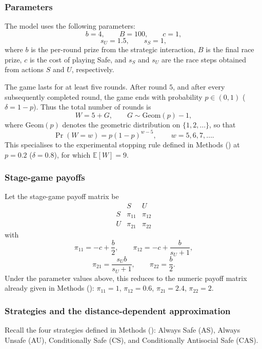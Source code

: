 \documentclass[pdflatex,sn-mathphys-ay]{sn-jnl}
\theoremstyle{thmstyleone}
\theoremstyle{thmstyletwo}
\theoremstyle{thmstylethree}
\begin{document}
\subsubsection{Parameters}

The model uses the following parameters:
\[
b = 4, \qquad B = 100, \qquad c = 1,
\]
\[
s_U = 1.5, \qquad s_S = 1,
\]
where \(b\) is the per-round prize from the strategic interaction, \(B\) is the final race prize, \(c\) is the cost of playing Safe, and \(s_S\) and \(s_U\) are the race steps obtained from actions \(S\) and \(U\), respectively.

The game lasts for at least five rounds. After round \(5\), and after every subsequently completed round, the game ends with probability \(p\in(0,1)\) ($\delta=1-p$). Thus the total number of rounds is
\[
W = 5 + G,
\qquad
G \sim \mathrm{Geom}(p)-1,
\]
where \(\mathrm{Geom}(p)\) denotes the geometric distribution on \(\{1,2,\dots\}\), so that
\[
\Pr(W=w)=p(1-p)^{w-5},
\qquad w=5,6,7,\dots.
\]
This specialises to the experimental stopping rule defined in Methods () at \(p=0.2\) (\(\delta=0.8\)), for which \(\mathbb{E}[W]=9\).

\subsubsection{Stage-game payoffs}

Let the stage-game payoff matrix be
\[
\begin{array}{c|cc}
 & S & U\\
\hline
S & \pi_{11} & \pi_{12}\\
U & \pi_{21} & \pi_{22}
\end{array}
\]
with
\[
\pi_{11} = -c + \frac{b}{2},
\qquad
\pi_{12} = -c + \frac{b}{s_U+1},
\]
\[
\pi_{21} = \frac{s_U b}{s_U+1},
\qquad
\pi_{22} = \frac{b}{2}.
\]
Under the parameter values above, this reduces to the numeric payoff matrix already given in Methods (): \(\pi_{11}=1\), \(\pi_{12}=0.6\), \(\pi_{21}=2.4\), \(\pi_{22}=2\).

\subsubsection{Strategies and the distance-dependent approximation}

Recall the four strategies defined in Methods (): Always Safe (AS), Always Unsafe (AU), Conditionally Safe (CS), and Conditionally Antisocial Safe (CAS).
\end{document}
